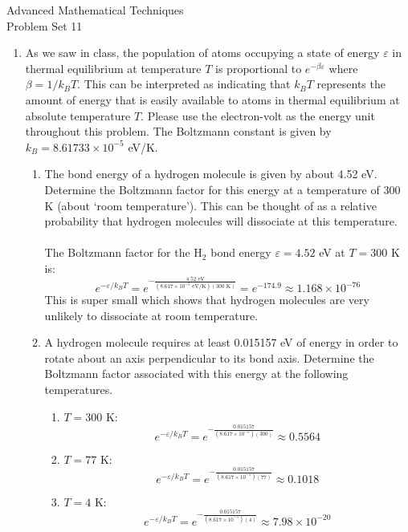 \documentclass{article}
\begin{document}
    \thispagestyle{fancy}
    \begin{center}
        \LARGE{Advanced Mathematical Techniques \\ Problem Set 11}
    \end{center}
    \vspace{10mm}
    \begin{enumerate}

        \item As we saw in class, the population of atoms occupying a state of energy $\varepsilon$ in thermal equilibrium at temperature $T$ is proportional to $e^{-\beta\varepsilon}$ where $\beta = 1/k_BT$. This can be interpreted as indicating that $k_BT$ represents the amount of energy that is easily available to atoms in thermal equilibrium at absolute temperature $T$. Please use the electron-volt as the energy unit throughout this problem. The Boltzmann constant is given by $k_B = 8.61733\times10^{-5}$ eV/K.

        \begin{enumerate}
            \item The bond energy of a hydrogen molecule is given by about 4.52 eV. Determine the Boltzmann factor for this energy at a temperature of 300 K (about `room temperature'). This can be thought of as a relative probability that hydrogen molecules will dissociate at this temperature.
            \\
            \\The Boltzmann factor for the H$_2$ bond energy $\varepsilon = 4.52$ eV at $T = 300$ K is:
            \[e^{-\varepsilon / k_B T} = e^{-\frac{4.52\text{ eV}}{(8.617\times10^{-5}\text{ eV/K})(300\text{ K})}} = \boxed{e^{-174.9} \approx 1.168\times10^{-76}}\]
            This is super small which shows that hydrogen molecules are very unlikely to dissociate at room temperature.
            \item A hydrogen molecule requires at least 0.015157 eV of energy in order to rotate about an axis perpendicular to its bond axis. Determine the Boltzmann factor associated with this energy at the following temperatures.
            \\
            \begin{enumerate}
                \item $T = 300$ K:
                \[e^{-\varepsilon/k_BT} = e^{-\frac{0.015157}{(8.617\times10^{-5})(300)}} \approx \boxed{0.5564}\]
                \item $T = 77$ K:
                \[e^{-\varepsilon/k_BT} = e^{-\frac{0.015157}{(8.617\times10^{-5})(77)}} \approx \boxed{0.1018}\]
                \item $T = 4$ K:
                \[e^{-\varepsilon/k_BT} = e^{-\frac{0.015157}{(8.617\times10^{-5})(4)}} \approx \boxed{7.98\times10^{-20}}\]
            \end{enumerate}


\end{enumerate}
\end{enumerate}
\end{document}
